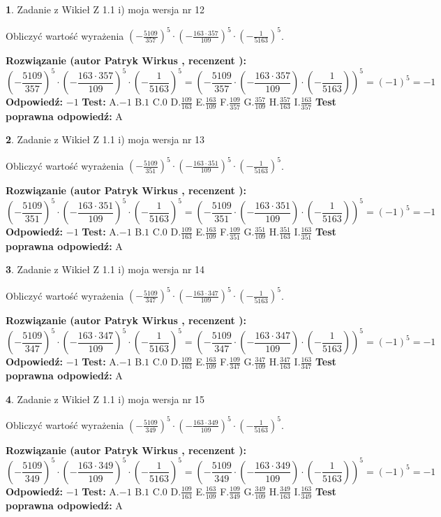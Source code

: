 \documentclass[12pt, a4paper]{article}
\theoremstyle{definition} %
\newtheorem{zad}{}
\newcommand{\zadStart}[1]{\begin{zad}#1\newline}
\newcommand{\zadStop}{\end{zad}}
\newcommand{\rozwStart}[2]{\noindent \textbf{Rozwiązanie (autor #1 , recenzent #2): }\newline}
\newcommand{\rozwStop}{\newline}
\newcommand{\odpStart}{\noindent \textbf{Odpowiedź:}\newline}
\newcommand{\odpStop}{\newline}
\newcommand{\testStart}{\noindent \textbf{Test:}\newline}
\newcommand{\testStop}{\newline}
\newcommand{\kluczStart}{\noindent \textbf{Test poprawna odpowiedź:}\newline}
\newcommand{\kluczStop}{\newline}
\begin{document}
\zadStart{Zadanie z Wikieł Z 1.1 i) moja wersja nr 12}

Obliczyć wartość wyrażenia $(-\frac{5109}{357})^{5} \cdot (-\frac{163 \cdot 357}{109})^{5} \cdot (-\frac{1}{5163})^{5}$.
\zadStop
\rozwStart{Patryk Wirkus}{}
$$(-\frac{5109}{357})^{5} \cdot (-\frac{163 \cdot 357}{109})^{5} \cdot (-\frac{1}{5163})^{5} = (-\frac{5109}{357} \cdot (-\frac{163 \cdot 357}{109}) \cdot (-\frac{1}{5163}))^{5} = (-1)^{5} = -1$$
\rozwStop
\odpStart
$-1$
\odpStop
\testStart
A.$-1$ B.$1$ C.$0$ D.$\frac{109}{163}$ E.$\frac{163}{109}$
F.$\frac{109}{357}$ G.$\frac{357}{109}$
H.$\frac{357}{163}$
I.$\frac{163}{357}$
\testStop
\kluczStart
A
\kluczStop



\zadStart{Zadanie z Wikieł Z 1.1 i) moja wersja nr 13}

Obliczyć wartość wyrażenia $(-\frac{5109}{351})^{5} \cdot (-\frac{163 \cdot 351}{109})^{5} \cdot (-\frac{1}{5163})^{5}$.
\zadStop
\rozwStart{Patryk Wirkus}{}
$$(-\frac{5109}{351})^{5} \cdot (-\frac{163 \cdot 351}{109})^{5} \cdot (-\frac{1}{5163})^{5} = (-\frac{5109}{351} \cdot (-\frac{163 \cdot 351}{109}) \cdot (-\frac{1}{5163}))^{5} = (-1)^{5} = -1$$
\rozwStop
\odpStart
$-1$
\odpStop
\testStart
A.$-1$ B.$1$ C.$0$ D.$\frac{109}{163}$ E.$\frac{163}{109}$
F.$\frac{109}{351}$ G.$\frac{351}{109}$
H.$\frac{351}{163}$
I.$\frac{163}{351}$
\testStop
\kluczStart
A
\kluczStop



\zadStart{Zadanie z Wikieł Z 1.1 i) moja wersja nr 14}

Obliczyć wartość wyrażenia $(-\frac{5109}{347})^{5} \cdot (-\frac{163 \cdot 347}{109})^{5} \cdot (-\frac{1}{5163})^{5}$.
\zadStop
\rozwStart{Patryk Wirkus}{}
$$(-\frac{5109}{347})^{5} \cdot (-\frac{163 \cdot 347}{109})^{5} \cdot (-\frac{1}{5163})^{5} = (-\frac{5109}{347} \cdot (-\frac{163 \cdot 347}{109}) \cdot (-\frac{1}{5163}))^{5} = (-1)^{5} = -1$$
\rozwStop
\odpStart
$-1$
\odpStop
\testStart
A.$-1$ B.$1$ C.$0$ D.$\frac{109}{163}$ E.$\frac{163}{109}$
F.$\frac{109}{347}$ G.$\frac{347}{109}$
H.$\frac{347}{163}$
I.$\frac{163}{347}$
\testStop
\kluczStart
A
\kluczStop



\zadStart{Zadanie z Wikieł Z 1.1 i) moja wersja nr 15}

Obliczyć wartość wyrażenia $(-\frac{5109}{349})^{5} \cdot (-\frac{163 \cdot 349}{109})^{5} \cdot (-\frac{1}{5163})^{5}$.
\zadStop
\rozwStart{Patryk Wirkus}{}
$$(-\frac{5109}{349})^{5} \cdot (-\frac{163 \cdot 349}{109})^{5} \cdot (-\frac{1}{5163})^{5} = (-\frac{5109}{349} \cdot (-\frac{163 \cdot 349}{109}) \cdot (-\frac{1}{5163}))^{5} = (-1)^{5} = -1$$
\rozwStop
\odpStart
$-1$
\odpStop
\testStart
A.$-1$ B.$1$ C.$0$ D.$\frac{109}{163}$ E.$\frac{163}{109}$
F.$\frac{109}{349}$ G.$\frac{349}{109}$
H.$\frac{349}{163}$
I.$\frac{163}{349}$
\testStop
\kluczStart
A
\kluczStop
\end{document}
